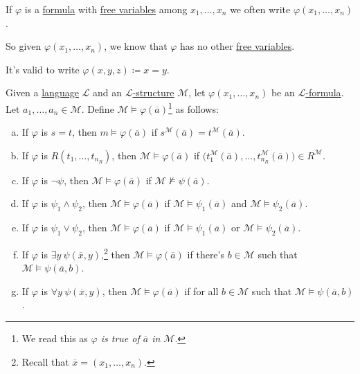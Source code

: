 \begin{notation}
	If \(\varphi \) is a \hyperref[def:formula]{formula} with \hyperref[def:free-variable]{free variables} among \(x_1, \ldots , x_n\) we often write \(\varphi (x_1, \ldots , x_n)\).
\end{notation}

\begin{remark}
	So given \(\varphi (x_1, \ldots , x_n)\), we know that \(\varphi \) has no other \hyperref[def:free-variable]{free variables}.
\end{remark}

\begin{eg}
	It's valid to write \(\varphi (x, y, z) \coloneqq x=y\).
\end{eg}

\begin{definition}[Truth]\label{def:truth}
	Given a \hyperref[def:language]{language} \(\mathcal{L} \) and an \hyperref[def:structure]{\(\mathcal{L} \)-structure} \(\mathcal{M} \), let \(\varphi (x_1, \ldots , x_n)\) be an \hyperref[def:formula]{\(\mathcal{L} \)-formula}. Let \(a_1, \ldots , a_n\in \mathcal{M} \). Define \(\mathcal{M} \models \varphi (\overline{a} )\)\footnote{We read this as \emph{\(\varphi \) is true of \(\overline{a} \) in \(\mathcal{M} \)}.} as follows:
	\begin{enumerate}[(a)]
		\item If \(\varphi \) is \(s=t\), then \(m\models \varphi (\overline{a} )\) if \(s^{\mathcal{M}} (\overline{a} ) = t^{\mathcal{M} } (\overline{a} )\).
		\item If \(\varphi \) is \(R(t_1, \ldots , t_{n_R})\), then \(\mathcal{M} \models \varphi (\overline{a} )\) if \(\big( t^{\mathcal{M} }_1(\overline{a} ), \ldots , t^{\mathcal{M} }_{n_R}(\overline{a} )  \big)\in R^{\mathcal{M} }\).
		\item If \(\varphi \) is \(\lnot \psi \), then \(\mathcal{M} \models \varphi (\overline{a} )\) if \(\mathcal{M} \not\models \psi (\overline{a} )\).
		\item If \(\varphi \) is \(\psi _1\land \psi _2\), then \(\mathcal{M} \models \varphi (\overline{a} )\) if \(\mathcal{M} \models \psi _1(\overline{a} )\) and \(\mathcal{M} \models \psi _2(\overline{a} )\).
		\item If \(\varphi \) is \(\psi _1\lor \psi _2\), then \(\mathcal{M} \models \varphi (\overline{a} )\) if \(\mathcal{M} \models \psi _1(\overline{a} )\) or \(\mathcal{M} \models \psi _2(\overline{a} )\).
		\item If \(\varphi \) is \(\exists y\ \psi (\overline{x} , y)\),\footnote{Recall that \(\overline{x} = (x_1, \ldots , x_n)\).} then \(\mathcal{M} \models \varphi (\overline{a} )\) if there's \(b\in \mathcal{M} \) such that \(\mathcal{M} \models \psi (\overline{a} , b)\).
		\item If \(\varphi \) is \(\forall y\ \psi (\overline{x} , y)\), then \(\mathcal{M} \models \varphi (\overline{a} )\) if for all \(b\in \mathcal{M} \) such that \(\mathcal{M} \models \psi (\overline{a} , b)\).
	\end{enumerate}
\end{definition}